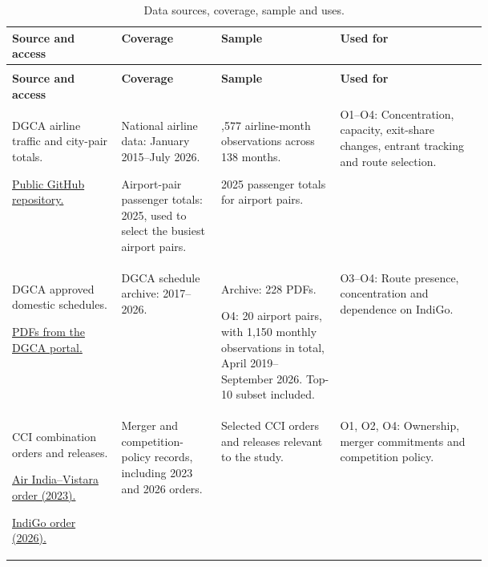 \par
\begingroup
\flowtablestyle
\color{black}
\begin{longtable}{|>{\raggedright\arraybackslash}p{0.23\linewidth}|>{\raggedright\arraybackslash}p{0.21\linewidth}|>{\raggedright\arraybackslash}p{0.25\linewidth}|>{\raggedright\arraybackslash}p{}|}
\caption{Data sources, coverage, sample and uses.}\label{tab:data-sources}\\
\hline
\textbf{Source and access} & \textbf{Coverage} & \textbf{Sample} & \textbf{Used for}\\
\hline
\endfirsthead
\multicolumn{4}{c}{\tablename~\thetable\ (continued)}\\
\hline
\textbf{Source and access} & \textbf{Coverage} & \textbf{Sample} & \textbf{Used for}\\
\hline
\endhead
\endfoot
\endlastfoot
DGCA airline traffic and city-pair totals.\par \href{https://github.com/mkubicek/india-aviation-stats}{Public GitHub repository.}
& National airline data: January 2015--July 2026.\par Airport-pair passenger totals: 2025, used to select the busiest airport pairs.
& 1,577 airline-month observations across 138 months.\par 2025 passenger totals for airport pairs.
& O1--O4: Concentration, capacity, exit-share changes, entrant tracking and route selection.\\
\hline
DGCA approved domestic schedules.\par \href{https://www.dgca.gov.in/digigov-portal/?page=4201/4200/servicename}{PDFs from the DGCA portal.}
& DGCA schedule archive: 2017--2026.
& Archive: 228 PDFs.\par O4: 20 airport pairs, with 1,150 monthly observations in total, April 2019--September 2026. Top-10 subset included.
& O3--O4: Route presence, concentration and dependence on IndiGo.\\
\hline
CCI combination orders and releases.\par \href{https://www.cci.gov.in/images/caseorders/en/order1695297548.pdf}{Air India--Vistara order (2023).}\par \href{https://cci.gov.in/images/antitrustorder/en/order1770207377.pdf}{IndiGo order (2026).}
& Merger and competition-policy records, including 2023 and 2026 orders.
& Selected CCI orders and releases relevant to the study.
& O1, O2, O4: Ownership, merger commitments and competition policy.\\

\end{longtable}
